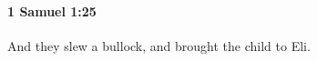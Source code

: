 
		\paragraph{1 Samuel 1:25} %
			\label{1SAMUEL-1-25}

			And they slew a bullock, and brought the child to Eli.



